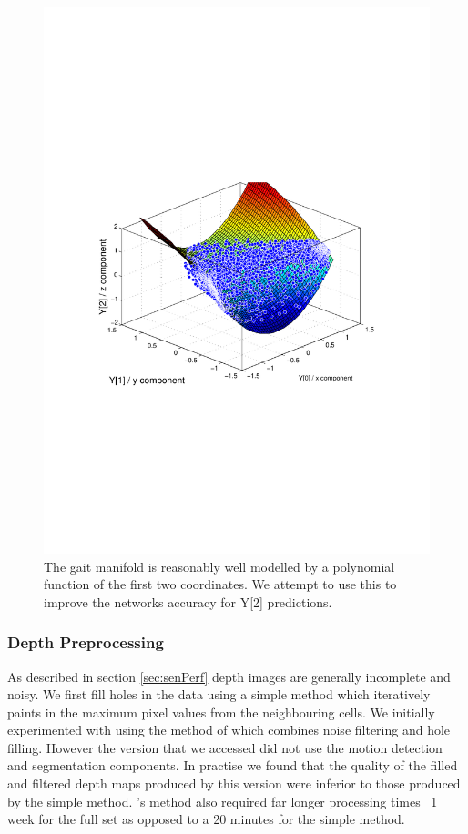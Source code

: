 \documentclass[11pt]{article} %
\begin{document}
\begin{figure}
\centering
\includegraphics*[trim={0 8cm 0 9cm},clip,width=0.75\linewidth,clip]{polyFit} 
\caption{The gait manifold is reasonably well modelled by a polynomial function of the first two coordinates. We attempt to use this to improve the networks accuracy for Y[2] predictions. }
\label{fig:polyFit}
\end{figure}













\subsubsection{Depth Preprocessing}

As described in section \ref{sec:senPerf} depth images are generally incomplete and noisy. We first fill holes in the data using a simple method which iteratively paints in the maximum pixel values from the neighbouring cells. We initially experimented with using the method of \cite{Camplani2012a} which combines noise filtering and hole filling. However the version that we accessed did not use the motion detection and segmentation components. In practise we found that the quality of the filled and filtered depth maps produced by this version were inferior to those produced by the simple method.  \cite{Camplani2012a}'s method also required far longer processing times ~1 week for the full set as opposed to a 20 minutes for the simple method. 
\end{document}
